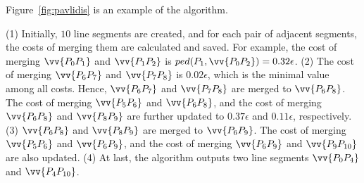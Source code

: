 \begin{example}
	\label{exm-alg-pavlidis}
	Figure~\ref{fig:pavlidis} is an example of the \tpa algorithm.
	
	\ni (1) Initially, $10$ line segments are created, and for each pair of adjacent segments, the costs of merging them are calculated and saved. For example, the cost of merging $\vv{P_0P_1}$ and $\vv{P_1P_2}$ is $ped(P_{1}, \vv{P_0P_{2}}) = 0.32\epsilon$.
	(2) The cost of merging $\vv{P_6P_7}$ and $\vv{P_7P_8}$ is $0.02\epsilon$, which is the minimal value among all costs. Hence, $\vv{P_6P_7}$ and $\vv{P_7P_8}$ are merged to $\vv{P_6P_8}$. The cost of merging $\vv{P_5P_6}$ and $\vv{P_6P_8}$, and the cost of merging $\vv{P_6P_8}$ and $\vv{P_8P_9}$ are further updated to $0.37\epsilon$ and $0.11\epsilon$, respectively.
	(3) $\vv{P_6P_8}$ and $\vv{P_8P_9}$ are merged to $\vv{P_6P_9}$. The cost of merging $\vv{P_5P_6}$ and $\vv{P_6P_9}$, and the cost of merging $\vv{P_6P_9}$ and $\vv{P_9P_{10}}$ are also updated.
	(4) At last, the algorithm outputs two line segments $\vv{P_0P_4}$ and $\vv{P_4P_{10}}$.
\end{example}



